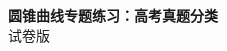 \documentclass[zihao=-4]{exam-zh}
\begin{document}
\begin{center}
{\bfseries 圆锥曲线专题练习：高考真题分类}\\[4pt]
{ 试卷版}
\end{center}

\end{document}
